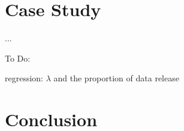 \documentclass[mnsc]{informs3}
\begin{document}
\section{Case Study}\label{sec-kaggle-application}

...

To Do:

regression: $\lambda$ and the proportion of data release


\section{Conclusion}


%
%
%
\end{document}
